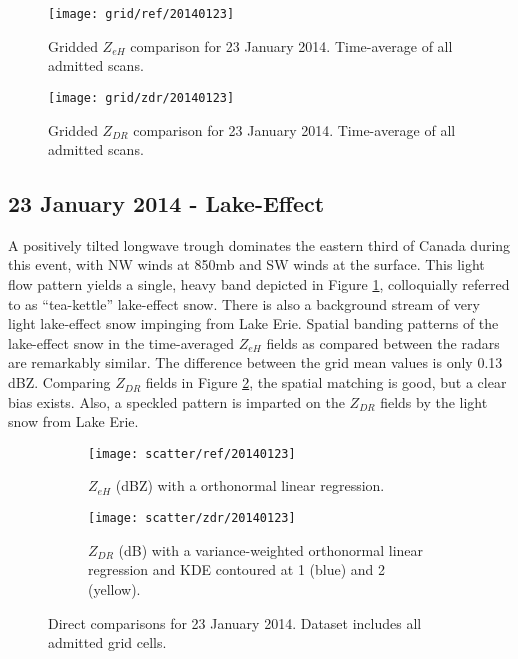 \begin{figure}[p]
\texttt{[image: grid/ref/20140123]}
\caption{Gridded $Z_{eH}$ comparison for 23 January 2014. Time-average of all admitted scans.} 
\label{fig:grid_ref_20140123}
\end{figure}

\begin{figure}[p]
\texttt{[image: grid/zdr/20140123]}
\caption{Gridded $Z_{DR}$ comparison for 23 January 2014. Time-average of all admitted scans.} 
\label{fig:grid_zdr_20140123}
\end{figure}

\subsection{23 January 2014 - Lake-Effect}
A positively tilted longwave trough dominates the eastern third of Canada during this event, with NW
winds at 850mb and SW winds at the surface. This light flow pattern yields a single, heavy
band depicted in Figure \ref{fig:grid_ref_20140123}, colloquially referred to as ``tea-kettle'' lake-effect
snow. There is also a background stream of very light lake-effect snow impinging from Lake Erie.
Spatial banding patterns of the lake-effect snow in the time-averaged $Z_{eH}$ fields as compared 
between the radars are remarkably similar. The difference between the grid mean values is only
0.13 dBZ. Comparing $Z_{DR}$ fields in Figure \ref{fig:grid_zdr_20140123}, the spatial matching is good, but a clear bias exists. Also, a speckled pattern is imparted on the $Z_{DR}$ fields
by the light snow from Lake Erie. 
\begin{figure}[H]
\centering
   \begin{subfigure}[t]{0.48\linewidth} \centering
     \texttt{[image: scatter/ref/20140123]}
     \caption{$Z_{eH}$ (dBZ) with a orthonormal linear regression.}\label{fig:scatter_ref_20140123}
   \end{subfigure}
   \begin{subfigure}[t]{0.48\linewidth} \centering
     \texttt{[image: scatter/zdr/20140123]}
     \caption{$Z_{DR}$ (dB) with a variance-weighted orthonormal linear regression and KDE contoured at 1 (blue) and 2 (yellow).}\label{fig:scatter_zdr_20140123}
   \end{subfigure}
\caption{Direct comparisons for 23 January 2014. Dataset includes all admitted grid cells.}
\label{fig:scatter_20140123}
\end{figure}

